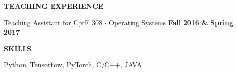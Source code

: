 \documentclass[11pt]{article}
\begin{document}
\begin{spacing}{1}
\begin{enumerate}[leftmargin=4.5em]
\end{enumerate}


\vspace{3mm}
{\bf \Large TEACHING EXPERIENCE}

\begin{list}{}{\leftmargin=4em}
\item {Teaching Assistant for CprE 308 - Operating Systems}\hfill \textbf{ Fall 2016 \& Spring 2017} 
\end{list}


\vspace{3mm}
{\bf \Large SKILLS}

\begin{list}{}{\leftmargin=4em}
\item  Python, Tensorflow, PyTorch, C/C++, JAVA\vspace{-2mm} \\
	
\end{list}

%




\end{spacing}
\end{document}

